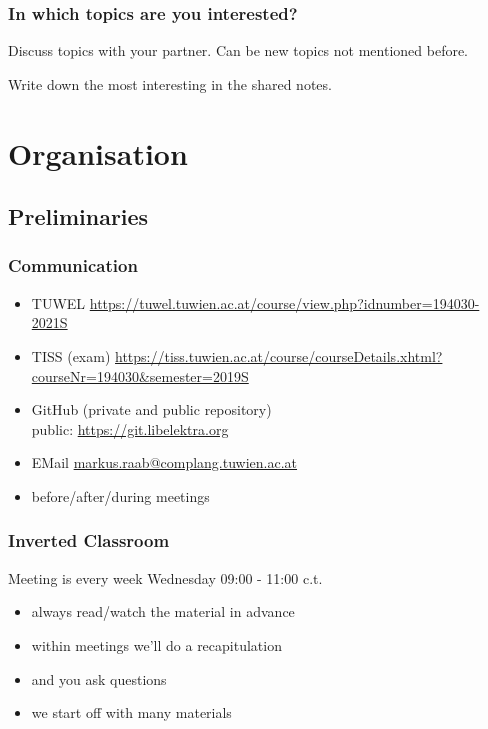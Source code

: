 \begin{assignment}
	\frametitle{In which topics are you interested?}
	\begin{task}[1]
	Discuss topics with your partner.
	Can be new topics not mentioned before.
	\end{task}

	\begin{task}[2]
	Write down the most interesting in the shared notes.
	\end{task}
\end{assignment}





\section{Organisation}

\subsection{Preliminaries}
\begin{frame}
	\frametitle{Communication}
	\begin{itemize}
		\item TUWEL \url{https://tuwel.tuwien.ac.at/course/view.php?idnumber=194030-2021S}
		\item TISS (exam) \url{https://tiss.tuwien.ac.at/course/courseDetails.xhtml?courseNr=194030&semester=2019S}
		\item GitHub (private and public repository) \\ public: \url{https://git.libelektra.org}
		\item EMail \url{markus.raab@complang.tuwien.ac.at}
		\item before/after/during meetings
	\end{itemize}
\end{frame}

\begin{frame}
	\frametitle{Inverted Classroom}
	Meeting is every week Wednesday 09:00 - 11:00 c.t.

	\begin{itemize}
		\item always read/watch the material in advance
		\item within meetings we'll do a recapitulation
		\item and you ask questions
		\item we start off with many materials
	\end{itemize}
\end{frame}

